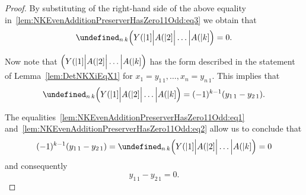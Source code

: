 \documentclass{elsarticle}
\let\det\undefined
\DeclareMathOperator{\det}{det}
\theoremstyle{plain}
\theoremstyle{definition}
\numberwithin{equation}{section}
\begin{document}
\begin{proof}
By substituting of the right-hand side of the above equality in~\eqref{lem:NKEvenAdditionPreserverHasZero11Odd:eq3} we obtain that
\begin{equation}\label{lem:NKEvenAdditionPreserverHasZero11Odd:eq1}
\det_{n\,k} \Bigl(Y(|1] \Big| A(|2] \Big| \ldots \Big| A(|k]\Bigr) = 0.
\end{equation}

Now note that $\Bigl(Y(|1] \Big| A(|2] \Big| \ldots \Big| A(|k]\Bigr)$ has the form described in the statement of Lemma~\ref{lem:DetNKXiEqX1} for $x_1 = y_{1\, 1}, \ldots, x_n = y_{n\,1}$. This implies that\begin{equation}\label{lem:NKEvenAdditionPreserverHasZero11Odd:eq2}
\det_{n\, k} \Bigl(Y(|1] \Big| A(|2] \Big| \ldots \Big| A(|k]\Bigr) = (-1)^{k-1}(y_{1\,1} - y_{2\,1}).
\end{equation}

The equalities~\eqref{lem:NKEvenAdditionPreserverHasZero11Odd:eq1} and~\eqref{lem:NKEvenAdditionPreserverHasZero11Odd:eq2} allow us to conclude that
\[
(-1)^{k-1}(y_{1\,1} - y_{2\,1}) = \det_{n\, k} \Bigl(Y(|1] \Big| A(|2] \Big| \ldots \Big| A(|k]\Bigr) = 0
\]
and consequently
\[
y_{1\,1} - y_{2\,1} = 0.
\]
\end{proof}
\end{document}
